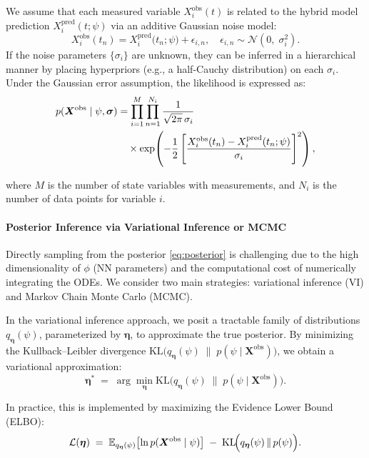 \documentclass[9pt,shortpaper,twoside,web]{ieeecolor}
\begin{document}
We assume that each measured variable \(X_i^{\text{obs}}(t)\) is related to the hybrid model prediction \(X_i^{\text{pred}}(t; \psi)\) via an additive Gaussian noise model:
\begin{equation}
    X_i^{\text{obs}}(t_n) = X_i^{\text{pred}}\bigl(t_n; \psi\bigr) + \epsilon_{i,n}, 
\quad 
\epsilon_{i,n} \sim \mathcal{N}(0,\;\sigma_i^2).
\end{equation}
If the noise parameters \(\{\sigma_i\}\) are unknown, they can be inferred in a hierarchical manner by placing hyperpriors (e.g., a half-Cauchy distribution) on each \(\sigma_i\). Under the Gaussian error assumption, the likelihood is expressed as:
\begin{align}
p(\bm{X}^{\text{obs}} \mid \psi, \bm{\sigma}) 
&= \prod_{i=1}^M \prod_{n=1}^{N_i} \frac{1}{\sqrt{2\pi}\,\sigma_i} \notag \\
&\quad \times \exp\!\left( 
-\frac{1}{2} \left[ \frac{X_i^{\text{obs}}(t_n) - X_i^{\text{pred}}(t_n; \psi)}{\sigma_i} \right]^2 
\right),
\label{eq:likelihood}
\end{align}

where \(M\) is the number of state variables with measurements, and \(N_i\) is the number of data points for variable \(i\).

\paragraph{Posterior Inference via Variational Inference or MCMC}

Directly sampling from the posterior \eqref{eq:posterior} is challenging due to the high dimensionality of \(\phi\) (NN parameters) and the computational cost of numerically integrating the ODEs. We consider two main strategies: variational inference (VI) and Markov Chain Monte Carlo (MCMC).

In the variational inference approach, we posit a tractable family of distributions \(q_{\bm{\eta}}(\psi)\), parameterized by \(\bm{\eta}\), to approximate the true posterior. By minimizing the Kullback--Leibler divergence \(\mathrm{KL}\bigl(q_{\bm{\eta}}(\psi) \;\|\; p(\psi\mid \bm{X}^{\text{obs}})\bigr)\), we obtain a variational approximation:
\begin{equation}
    \bm{\eta}^* \;=\; \arg\min_{\bm{\eta}} 
\mathrm{KL}\bigl(q_{\bm{\eta}}(\psi) \;\|\; p(\psi\mid \bm{X}^{\text{obs}})\bigr).
\end{equation}

In practice, this is implemented by maximizing the Evidence Lower Bound (ELBO):
\begin{equation}
    \mathcal{L}(\bm{\eta}) 
\;=\; 
\mathbb{E}_{q_{\bm{\eta}}(\psi)}
\bigl[\ln p(\bm{X}^{\text{obs}} \mid \psi)\bigr] 
\;-\; \mathrm{KL}\!\Bigl(q_{\bm{\eta}}(\psi) \,\|\, p(\psi)\Bigr).
\end{equation}
\end{document}
